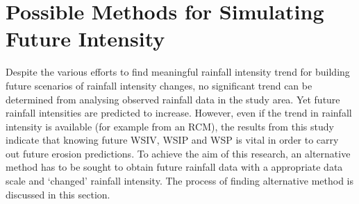 

\section{Possible Methods for Simulating Future Intensity}
\label{sec:ProposedSimulationMethods}

Despite the various efforts to find meaningful rainfall intensity trend for
building future scenarios of rainfall intensity changes, no significant trend
can be determined from analysing observed rainfall data in the study area.
Yet future rainfall intensities are predicted to increase.
However, even if the trend in rainfall intensity is available (for
example from an RCM), the results from this study indicate that knowing future
WSIV, WSIP and WSP is vital in order to carry out future erosion predictions. To
achieve the aim of this research, an alternative method has to be sought to
obtain future rainfall data with a appropriate data scale and `changed' rainfall
intensity. The process of finding alternative method is discussed in this
section.




